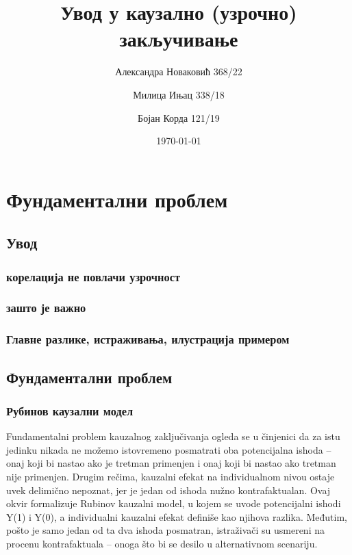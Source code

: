 \documentclass[12pt, a4paper]{article}
\title{Увод у каузално (узрочно) закључивање}
\author{Александра Новаковић 368/22}
\author{Милица Ињац 338/18}
\author{Бојан Корда 121/19}
\affil{Математички факултет, Универзитет у Београду}
\date{\today}
\begin{document}
\maketitle
\newpage

\tableofcontents
\newpage

\section{Фундаментални проблем}
    \subsection{Увод}
    \subsubsection{корелација не повлачи узрочност}
    \subsubsection{зашто је важно}
    \subsubsection{Главне разлике, истраживања, илустрација примером}
\subsection{Фундаментални проблем}
    \subsubsection{Рубинов каузални модел}
    Fundamentalni problem kauzalnog zaključivanja ogleda se u činjenici da za istu jedinku nikada ne možemo istovremeno posmatrati 
    oba potencijalna ishoda – onaj koji bi nastao ako je tretman primenjen i onaj koji bi nastao ako tretman nije primenjen. 
    Drugim rečima, kauzalni efekat na individualnom nivou ostaje uvek delimično nepoznat, jer je jedan od ishoda nužno kontrafaktualan.
     Ovaj okvir formalizuje Rubinov kauzalni model, u kojem se uvode potencijalni ishodi Y(1) i Y(0), a individualni kauzalni efekat 
     definiše kao njihova razlika. Međutim, pošto je samo jedan od ta dva ishoda posmatran, istraživači su usmereni na procenu 
     kontrafaktuala – onoga što bi se desilo u alternativnom scenariju.
\end{document}
